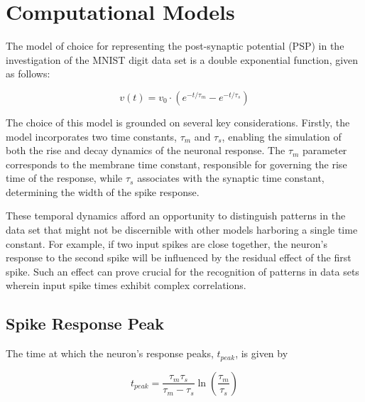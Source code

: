 \section{Computational Models}

The model of choice for representing the post-synaptic potential (PSP) in the investigation of the MNIST digit data set is a double exponential function, given as follows:

\begin{equation}
    v(t) = v_0 \cdot (e^{-t/\tau_m} - e^{-t/\tau_s})
\end{equation}

The choice of this model is grounded on several key considerations. Firstly, the model incorporates two time constants, $\tau_m$ and $\tau_s$, enabling the simulation of both the rise and decay dynamics of the neuronal response. The $\tau_m$ parameter corresponds to the membrane time constant, responsible for governing the rise time of the response, while $\tau_s$ associates with the synaptic time constant, determining the width of the spike response.

These temporal dynamics afford an opportunity to distinguish patterns in the data set that might not be discernible with other models harboring a single time constant. For example, if two input spikes are close together, the neuron's response to the second spike will be influenced by the residual effect of the first spike. Such an effect can prove crucial for the recognition of patterns in data sets wherein input spike times exhibit complex correlations.

\subsection{Spike Response Peak}

\begin{mdframed}[backgroundcolor=red_background, linecolor=black, linewidth=2pt, frametitle=\textbf{Statement}]
\begin{center}

    \label{st:peak}
    The time at which the neuron's response peaks, $t_{peak}$, is given by

    
\begin{equation}
t_{peak} = \frac{\tau_m \tau_s}{\tau_m - \tau_s} \ln\left(\frac{\tau_m}{\tau_s}\right)
\end{equation}

\end{center}
\end{mdframed}

